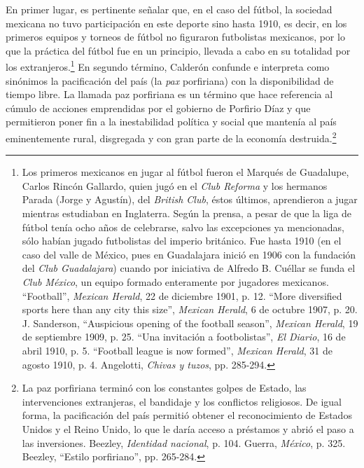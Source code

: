 \documentclass[11pt,a5paper,twoside]{book} %
\begin{document}
En primer lugar, es pertinente señalar que, en el caso del fútbol, la sociedad mexicana
no tuvo participación en este deporte sino hasta 1910, es decir, en los primeros equipos y
torneos de fútbol no figuraron futbolistas mexicanos, por lo que la práctica del fútbol fue en
un principio, llevada a cabo en su totalidad por los extranjeros.\footnote{Los primeros mexicanos en jugar al fútbol fueron el Marqués de Guadalupe, Carlos Rincón Gallardo, quien jugó en el \emph{Club Reforma} y los hermanos Parada (Jorge y Agustín), del \emph{British Club}, éstos últimos, aprendieron a jugar mientras estudiaban en Inglaterra. Según la prensa, a pesar de que la liga de fútbol tenía ocho años de celebrarse, salvo las excepciones ya mencionadas, sólo habían jugado futbolistas del imperio británico. Fue hasta 1910 (en el caso del valle de México, pues en Guadalajara inició en 1906 con la fundación del \emph{Club Guadalajara}) cuando por iniciativa de Alfredo B. Cuéllar se funda el \emph{Club México}, un equipo formado enteramente por jugadores mexicanos. ``Football'', \emph{Mexican Herald}, 22 de diciembre 1901, p. 12. ``More diversified sports here than any city this size'', \emph{Mexican Herald}, 6 de octubre 1907, p. 20. J. Sanderson, ``Auspicious opening of the football season'', \emph{Mexican Herald}, 19 de septiembre 1909, p. 25. ``Una invitación a footbolistas'', \emph{El Diario}, 16 de abril 1910, p. 5. ``Football league is now formed'', \emph{Mexican Herald}, 31 de agosto 1910, p. 4. Angelotti, \emph{Chivas y tuzos}, pp. 285-294.} En segundo término,
Calderón confunde e interpreta como sinónimos la pacificación del país (la \emph{pax} porfiriana)
con la disponibilidad de tiempo libre. La llamada paz porfiriana es un término que hace
referencia al cúmulo de acciones emprendidas por el gobierno de Porfirio Díaz y que permitieron poner fin a la inestabilidad política y social que mantenía al país eminentemente rural, disgregada y con gran parte de la economía destruida.\footnote{La paz porfiriana terminó con los constantes golpes de Estado, las intervenciones extranjeras, el bandidaje y los conflictos religiosos. De igual forma, la pacificación del país permitió obtener el reconocimiento de Estados Unidos y el Reino Unido, lo que le daría acceso a préstamos y abrió el paso a las inversiones. Beezley, \emph{Identidad nacional}, p. 104. Guerra, \emph{México}, p. 325. Beezley, ``Estilo porfiriano'', pp. 265-284.}
\end{document}
